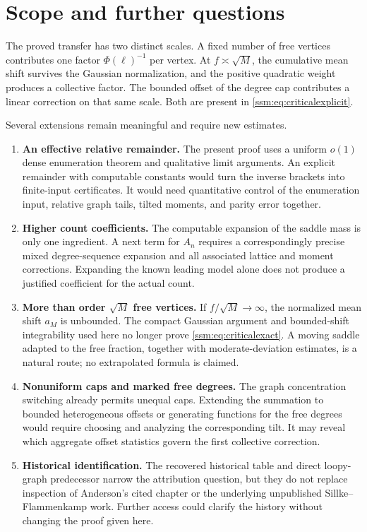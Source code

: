 \section{Scope and further questions}\label{ssm:sec:outlook}
The proved transfer has two distinct scales. A fixed number of free vertices contributes one factor $\Phi(\ell)^{-1}$ per vertex. At $f\asymp\sqrt M$, the cumulative mean shift survives the Gaussian normalization, and the positive quadratic weight produces a collective factor. The bounded offset of the degree cap contributes a linear correction on that same scale. Both are present in \eqref{ssm:eq:criticalexplicit}.

Several extensions remain meaningful and require new estimates.
\begin{enumerate}
\item \textbf{An effective relative remainder.} The present proof uses a uniform $o(1)$ dense enumeration theorem and qualitative limit arguments. An explicit remainder with computable constants would turn the inverse brackets into finite-input certificates. It would need quantitative control of the enumeration input, relative graph tails, tilted moments, and parity error together.
\item \textbf{Higher count coefficients.} The computable expansion of the saddle mass is only one ingredient. A next term for $A_n$ requires a correspondingly precise mixed degree-sequence expansion and all associated lattice and moment corrections. Expanding the known leading model alone does not produce a justified coefficient for the actual count.
\item \textbf{More than order $\sqrt M$ free vertices.} If $f/\sqrt M\to\infty$, the normalized mean shift $a_M$ is unbounded. The compact Gaussian argument and bounded-shift integrability used here no longer prove \eqref{ssm:eq:criticalexact}. A moving saddle adapted to the free fraction, together with moderate-deviation estimates, is a natural route; no extrapolated formula is claimed.
\item \textbf{Nonuniform caps and marked free degrees.} The graph concentration switching already permits unequal caps. Extending the summation to bounded heterogeneous offsets or generating functions for the free degrees would require choosing and analyzing the corresponding tilt. It may reveal which aggregate offset statistics govern the first collective correction.
\item \textbf{Historical identification.} The recovered historical table and direct loopy-graph predecessor narrow the attribution question, but they do not replace inspection of Anderson's cited chapter or the underlying unpublished Sillke--Flammenkamp work. Further access could clarify the history without changing the proof given here.
\end{enumerate}

